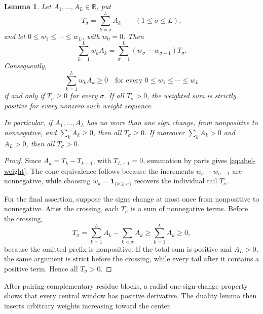 \documentclass[11pt,a4paper]{amsart}
\numberwithin{equation}{section}
\theoremstyle{plain}
\newtheorem{lemma}[theorem]{Lemma}
\theoremstyle{definition}
\begin{document}
\begin{lemma}\label{lem:weighting}
Let \(A_1,\dots,A_L\in\mathbb R\), put
\[
 T_\sigma=\sum_{k=\sigma}^L A_k\qquad(1\le \sigma\le L),
\]
and let \(0\le w_1\le\cdots\le w_L\), with \(w_0=0\).  Then
\begin{equation}\label{eq:abel-weight}
 \sum_{k=1}^L w_kA_k
 =\sum_{\sigma=1}^L(w_\sigma-w_{\sigma-1})T_\sigma.
\end{equation}
Consequently,
\[
 \sum_{k=1}^L w_kA_k\ge0
 \quad\text{for every }0\le w_1\le\cdots\le w_L
\]
if and only if \(T_\sigma\ge0\) for every \(\sigma\).  If all \(T_\sigma>0\), the weighted sum
is strictly positive for every nonzero such weight sequence.

In particular, if \(A_1,\dots,A_L\) has no more than one sign change, from
nonpositive to nonnegative, and \(\sum_kA_k\ge0\), then all \(T_\sigma\ge0\).
If moreover \(\sum_kA_k>0\) and \(A_L>0\), then all \(T_\sigma>0\).
\end{lemma}

\begin{proof}
Since \(A_k=T_k-T_{k+1}\), with \(T_{L+1}=0\), summation by parts gives
\eqref{eq:abel-weight}.  The cone equivalence follows because the increments
\(w_\sigma-w_{\sigma-1}\) are nonnegative, while choosing
\(w_k=\mathbf 1_{\{k\ge \sigma\}}\) recovers the individual tail \(T_\sigma\).

For the final assertion, suppose the signs change at most once from nonpositive
to nonnegative.  After the crossing, each \(T_\sigma\) is a sum of nonnegative
terms.  Before the crossing,
\[
 T_\sigma=\sum_{k=1}^L A_k-\sum_{k<\sigma}A_k
 \ge \sum_{k=1}^L A_k\ge0,
\]
because the omitted prefix is nonpositive.  If the total sum is positive and
\(A_L>0\), the same argument is strict before the crossing, while every tail
after it contains a positive term.  Hence all \(T_\sigma>0\).
\end{proof}

After pairing complementary residue blocks, a radial one-sign-change property shows
that every central window has positive derivative.  The duality lemma then inserts
arbitrary weights increasing toward the center.
\end{document}
